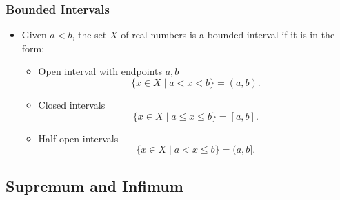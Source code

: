 \documentclass{article}
\newcommand{\set}[2]{\{ #1 \mid #2 \}}
\newcommand{\?}{\stackrel{?}{=}}
\newcommand{\smallblacksquare}{\rule{0.5em}{0.5em}}
\theoremstyle{definition} %
\begin{document}
\subsubsection{Bounded Intervals}

\begin{itemize}
    \item Given $a < b$, the set $X$ of real numbers is a bounded interval if it is in the form:
          \begin{itemize}[label=\smallblacksquare]
              \item Open interval with endpoints $a, b$
                    $$\set{x \in X}{a < x < b} = (a, b).$$
              \item Closed intervals
                    $$\set{x \in X}{a \leq x \leq b} = [a, b].$$
              \item Half-open intervals
                    $$\set{x \in X}{a < x \leq b} = (a, b].$$
          \end{itemize}
\end{itemize}

\subsection{Supremum and Infimum}
\end{document}
